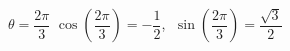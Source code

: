{$\theta = \dfrac{2\pi}{3}$}
{$\cos\left(\dfrac{2\pi}{3}\right) = -\dfrac{1}{2}$, $\; \sin \left(\dfrac{2\pi}{3}\right) = \dfrac{\sqrt{3}}{2}$}
